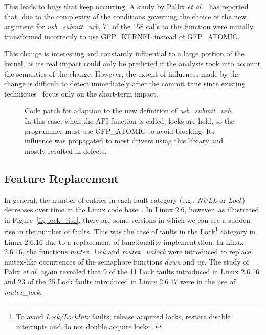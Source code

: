 This leads to bugs that keep occurring.
A study by Pallix {\em et al.}~\cite{Palix10Faults} has reported that, due to
the complexity of the conditions governing the choice of the new argument for
{\em usb\_submit\_urb}, 71 of the 158 calls to this function were initially
transformed incorrectly to use GFP\_KERNEL instead of GFP\_ATOMIC.


This change is interesting and constantly influential to a large portion of the
kernel, as its real impact could only be predicted if the analysis took into
account the semantics of the change. However, the extent of influences made by
the change is difficult to detect immediately after
the commit time since existing
techniques~\cite{ren_chianti:_2004,zhang_faulttracer:_2012,robillard_retrieving_2008,sherriff_empirical_2008}
focus only on the short-term impact.


\begin{figure}[!ht]
\centering
{\parbox{\linewidth}{

}}%
\caption{Code patch for adaption to the new definition of {\em usb\_submit\_urb}.
    In this case, when the API function is called, locks are held, so the programmer must use
    GFP\_ATOMIC to avoid blocking. Its influence was propagated to most
    drivers using this library and mostly resulted in defects.}
\label{listing:usb}
\end{figure}


\subsection{Feature Replacement}
\label{sec:motivation2}

In general, the number of entries in each fault category (e.g., {\em NULL} or {\em Lock})
decreases over
time in the Linux code base~\cite{Palix10Faults}.
In Linux 2.6, however, as illustrated in Figure~\ref{fig:lock_rise}, there are
some versions in which we can see a sudden rise in the number of faults.
This was the case of faults in the Lock\footnote{To avoid {\em Lock/LockIntr}
faults, release acquired locks, restore disable interrupts and do not double
acquire locks~\cite{Palix10Faults,Diagnosys}.
} 
category in Linux 2.6.16 due to a replacement of
functionality implementation.
In Linux 2.6.16, the functions {\em mutex\_lock} and {\em mutex\_unlock} were
introduced to replace mutex-like occurrences of the semaphore functions {\em
down} and {\em up}. The study of Palix {\em et al.} again revealed that 9 of the
11 Lock faults introduced in Linux  2.6.16 and 23 of the 25 Lock faults
introduced in Linux 2.6.17 were in the use of {\em mutex\_lock}.

